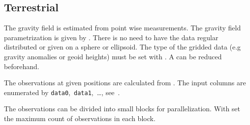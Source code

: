 \subsection{Terrestrial}\label{observationType:terrestrial}
The gravity field is estimated from point wise measurements.
The gravity field parametrization is given by .
There is no need to have the data regular distributed or given on a sphere or ellipsoid.
The type of the gridded data (e.g gravity anomalies or geoid heights)
must be set with .
A  can be reduced beforehand.

The observations at given positions are calculated from
.
The input columns are enumerated by \verb|data0|,~\verb|data1|,~\ldots,
see~.

The observations can be divided into small blocks for parallelization.
With  set the maximum count of observations in each block.


